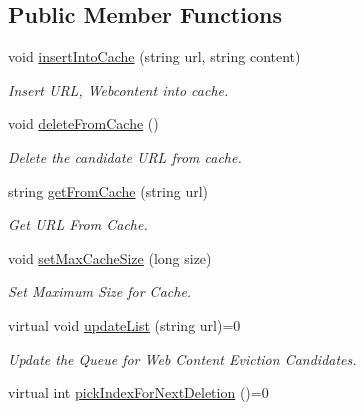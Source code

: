 \subsection*{\-Public \-Member \-Functions}
\begin{DoxyCompactItemize}
\item 
void \hyperlink{classAbstractCache_adcfda4aa5503e9ea60d2bc5575c04cd3}{insert\-Into\-Cache} (string url, string content)
\begin{DoxyCompactList}\small\item\em \-Insert \-U\-R\-L, \-Webcontent into cache. \end{DoxyCompactList}\item 
void \hyperlink{classAbstractCache_a7cba328082bcd2f8a02e52546b9dd244}{delete\-From\-Cache} ()
\begin{DoxyCompactList}\small\item\em \-Delete the candidate \-U\-R\-L from cache. \end{DoxyCompactList}\item 
string \hyperlink{classAbstractCache_a9b49b5835bbe2fa878bac959ebbec925}{get\-From\-Cache} (string url)
\begin{DoxyCompactList}\small\item\em \-Get \-U\-R\-L \-From \-Cache. \end{DoxyCompactList}\item 
void \hyperlink{classAbstractCache_a0b8d729d097b1726cb01fa8d35a25e62}{set\-Max\-Cache\-Size} (long size)
\begin{DoxyCompactList}\small\item\em \-Set \-Maximum \-Size for \-Cache. \end{DoxyCompactList}\item 
\hypertarget{classAbstractCache_a67552fbca85ce7dbc7e2c553b1036884}{virtual void \hyperlink{classAbstractCache_a67552fbca85ce7dbc7e2c553b1036884}{update\-List} (string url)=0}\label{classAbstractCache_a67552fbca85ce7dbc7e2c553b1036884}

\begin{DoxyCompactList}\small\item\em \-Update the \-Queue for \-Web \-Content \-Eviction \-Candidates. \end{DoxyCompactList}\item 
\hypertarget{classAbstractCache_ae9fe168b0b9167c27b94b4a3a1be788c}{virtual int \hyperlink{classAbstractCache_ae9fe168b0b9167c27b94b4a3a1be788c}{pick\-Index\-For\-Next\-Deletion} ()=0}\label{classAbstractCache_ae9fe168b0b9167c27b94b4a3a1be788c}


\end{DoxyCompactItemize}
